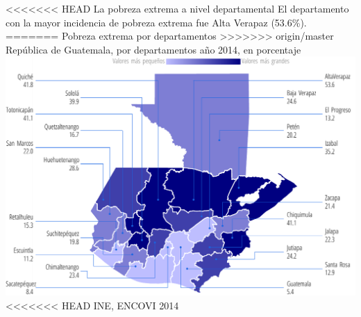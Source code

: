                     {%
<<<<<<< HEAD
                   La pobreza extrema a nivel departamental  }%
                    {%
                    El departamento con la mayor incidencia de pobreza extrema fue Alta Verapaz (53.6\%).
=======
                    }%
                    {%
                    	Pobreza extrema por departamentos
>>>>>>> origin/master
                    } %
                    {%
                    	República de Guatemala, por departamentos año 2014, en porcentaje} %
                    {%
                    	\includegraphics[width=52\cuadri]{graficas/1_18.pdf}}%
                    {%
<<<<<<< HEAD
                    	INE, ENCOVI 2014} %
                    
                     
